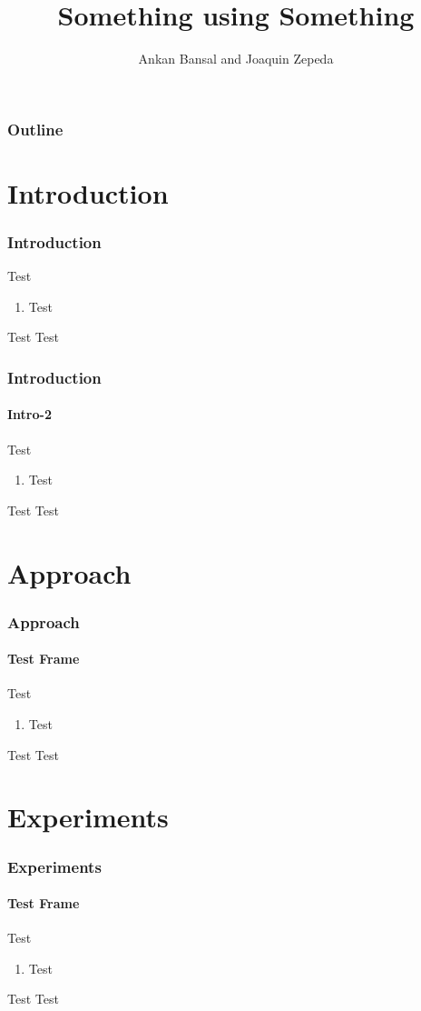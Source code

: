 \documentclass{beamer}
\title{Something using Something}
\author{Ankan Bansal and Joaquin Zepeda}
\date{}
\begin{document}
\maketitle

\begin{frame}
	\frametitle{Outline}
	\tableofcontents
\end{frame}

\section{Introduction}
\begin{frame}
	\frametitle{Introduction}
	Test
	\begin{enumerate}
		\item Test
	\end{enumerate}
	\begin{block}{Test}
		Test
	\end{block}
\end{frame}

\begin{frame}
	\frametitle{Introduction}
	\framesubtitle{Intro-2}
	Test
	\begin{enumerate}
		\item Test
	\end{enumerate}
	\begin{block}{Test}
		Test
	\end{block}
\end{frame}


\section{Approach}
\begin{frame}
	\frametitle{Approach}
	\framesubtitle{Test Frame}
	Test
	\begin{enumerate}
		\item Test
	\end{enumerate}
	\begin{block}{Test}
		Test
	\end{block}
\end{frame}

\section{Experiments}
\begin{frame}
	\frametitle{Experiments}
	\framesubtitle{Test Frame}
	Test
	\begin{enumerate}
		\item Test
	\end{enumerate}
	\begin{block}{Test}
		Test
	\end{block}
\end{frame}
\end{document}
